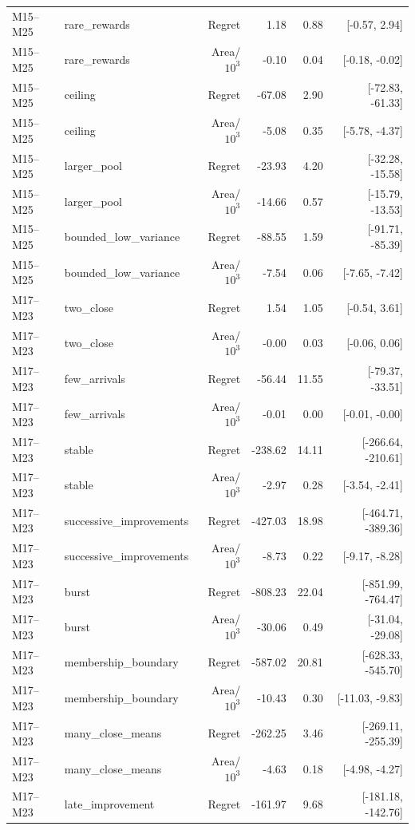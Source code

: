 \documentclass[11pt]{article}
\theoremstyle{remark}
\begin{document}
\begin{longtable}{llrrrr}
M15--M25 & rare\_rewards & Regret & 1.18 & 0.88 & [-0.57, 2.94] \\
M15--M25 & rare\_rewards & Area/$10^3$ & -0.10 & 0.04 & [-0.18, -0.02] \\
M15--M25 & ceiling & Regret & -67.08 & 2.90 & [-72.83, -61.33] \\
M15--M25 & ceiling & Area/$10^3$ & -5.08 & 0.35 & [-5.78, -4.37] \\
M15--M25 & larger\_pool & Regret & -23.93 & 4.20 & [-32.28, -15.58] \\
M15--M25 & larger\_pool & Area/$10^3$ & -14.66 & 0.57 & [-15.79, -13.53] \\
M15--M25 & bounded\_low\_variance & Regret & -88.55 & 1.59 & [-91.71, -85.39] \\
M15--M25 & bounded\_low\_variance & Area/$10^3$ & -7.54 & 0.06 & [-7.65, -7.42] \\
M17--M23 & two\_close & Regret & 1.54 & 1.05 & [-0.54, 3.61] \\
M17--M23 & two\_close & Area/$10^3$ & -0.00 & 0.03 & [-0.06, 0.06] \\
M17--M23 & few\_arrivals & Regret & -56.44 & 11.55 & [-79.37, -33.51] \\
M17--M23 & few\_arrivals & Area/$10^3$ & -0.01 & 0.00 & [-0.01, -0.00] \\
M17--M23 & stable & Regret & -238.62 & 14.11 & [-266.64, -210.61] \\
M17--M23 & stable & Area/$10^3$ & -2.97 & 0.28 & [-3.54, -2.41] \\
M17--M23 & successive\_improvements & Regret & -427.03 & 18.98 & [-464.71, -389.36] \\
M17--M23 & successive\_improvements & Area/$10^3$ & -8.73 & 0.22 & [-9.17, -8.28] \\
M17--M23 & burst & Regret & -808.23 & 22.04 & [-851.99, -764.47] \\
M17--M23 & burst & Area/$10^3$ & -30.06 & 0.49 & [-31.04, -29.08] \\
M17--M23 & membership\_boundary & Regret & -587.02 & 20.81 & [-628.33, -545.70] \\
M17--M23 & membership\_boundary & Area/$10^3$ & -10.43 & 0.30 & [-11.03, -9.83] \\
M17--M23 & many\_close\_means & Regret & -262.25 & 3.46 & [-269.11, -255.39] \\
M17--M23 & many\_close\_means & Area/$10^3$ & -4.63 & 0.18 & [-4.98, -4.27] \\
M17--M23 & late\_improvement & Regret & -161.97 & 9.68 & [-181.18, -142.76] \\

\end{longtable}
\end{document}
